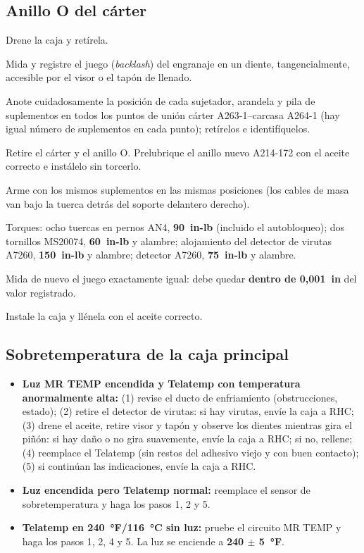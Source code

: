 \subsection{Anillo O del cárter}

\begin{pasos}
\item Drene la caja y retírela.
\item Mida y registre el juego (\emph{backlash}) del engranaje en un diente, tangencialmente, accesible por el visor o el tapón de llenado.
\item Anote cuidadosamente la posición de cada sujetador, arandela y pila de suplementos en todos los puntos de unión cárter A263-1--carcasa A264-1 (hay igual número de suplementos en cada punto); retírelos e identifíquelos.
\item Retire el cárter y el anillo O. Prelubrique el anillo nuevo A214-172 con el aceite correcto e instálelo sin torcerlo.
\item Arme con los mismos suplementos en las mismas posiciones (los cables de masa van bajo la tuerca detrás del soporte delantero derecho).
\item Torques: ocho tuercas en pernos AN4, \textbf{90~in-lb} (incluido el autobloqueo); dos tornillos MS20074, \textbf{60~in-lb} y alambre; alojamiento del detector de virutas A7260, \textbf{150~in-lb} y alambre; detector A7260, \textbf{75~in-lb} y alambre.
\item Mida de nuevo el juego exactamente igual: debe quedar \textbf{dentro de 0,001~in} del valor registrado.
\item Instale la caja y llénela con el aceite correcto.
\end{pasos}

\subsection{Sobretemperatura de la caja principal}

\begin{itemize}
\item \textbf{Luz \textsf{MR TEMP} encendida y Telatemp con temperatura anormalmente alta:} (1) revise el ducto de enfriamiento (obstrucciones, estado); (2) retire el detector de virutas: si hay virutas, envíe la caja a RHC; (3) drene el aceite, retire visor y tapón y observe los dientes mientras gira el piñón: si hay daño o no gira suavemente, envíe la caja a RHC; si no, rellene; (4) reemplace el Telatemp (sin restos del adhesivo viejo y con buen contacto); (5) si continúan las indicaciones, envíe la caja a RHC.
\item \textbf{Luz encendida pero Telatemp normal:} reemplace el sensor de sobretemperatura y haga los pasos 1, 2 y 5.
\item \textbf{Telatemp en 240~°F/116~°C sin luz:} pruebe el circuito \textsf{MR TEMP} y haga los pasos 1, 2, 4 y 5. La luz se enciende a \textbf{240 $\pm$ 5~°F}.
\end{itemize}

